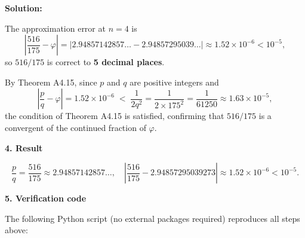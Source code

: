 \documentclass[11pt]{article}
\newenvironment{solution}
{\par\noindent\textbf{Solution:}\par}
{\vspace{1em}}
\begin{document}
\begin{solution}
The approximation error at $n=4$ is
\[\left|\frac{516}{175} - \varphi\right| = |2.94857142857\ldots - 2.94857295039\ldots| \approx 1.52\times10^{-6} < 10^{-5},\]
so $516/175$ is correct to \textbf{5 decimal places}.

By Theorem A4.15, since $p$ and $q$ are positive integers and
\[\left|\frac{p}{q} - \varphi\right| = 1.52\times10^{-6} \;<\; \frac{1}{2q^2} = \frac{1}{2\times175^2} = \frac{1}{61250} \approx 1.63\times10^{-5},\]
the condition of Theorem A4.15 is satisfied, confirming that $516/175$ is a convergent of the continued fraction of $\varphi$.

\textbf{4. Result}

\[\boxed{\frac{p}{q} = \frac{516}{175} \approx 2.94857142857\ldots,\quad \left|\frac{516}{175} - 2.94857295039273\right| \approx 1.52\times10^{-6} < 10^{-5}.}\]

\textbf{5. Verification code}

The following Python script (no external packages required) reproduces all steps above:


\end{solution}
\end{document}
